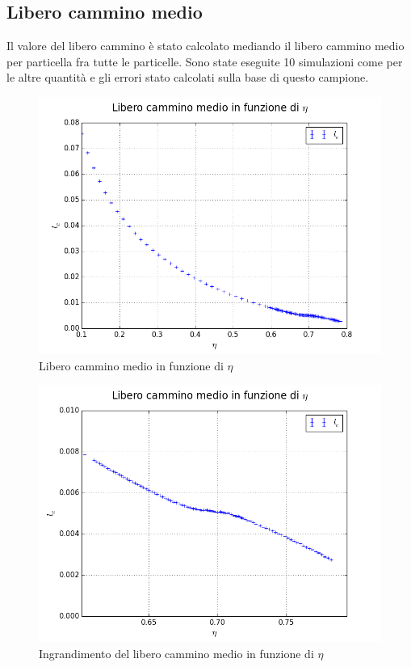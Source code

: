 \subsection{Libero cammino medio}
Il valore del libero cammino è stato calcolato mediando il libero cammino medio per particella fra tutte le particelle. Sono state eseguite 10 simulazioni come per le altre quantità e gli errori stato calcolati sulla base di questo campione.\\

\begin{figure}[h!]
	\centering
	\includegraphics[scale=0.48]{sfere2D/mfp.png}
	\caption{Libero cammino medio in funzione di $\eta$}
	\end{figure}

\begin{figure}[h!]
	\centering
	\includegraphics[scale=0.48]{sfere2D/mfpzoom.png}
	\caption{Ingrandimento del libero cammino medio in funzione di $\eta$}
	\end{figure}

